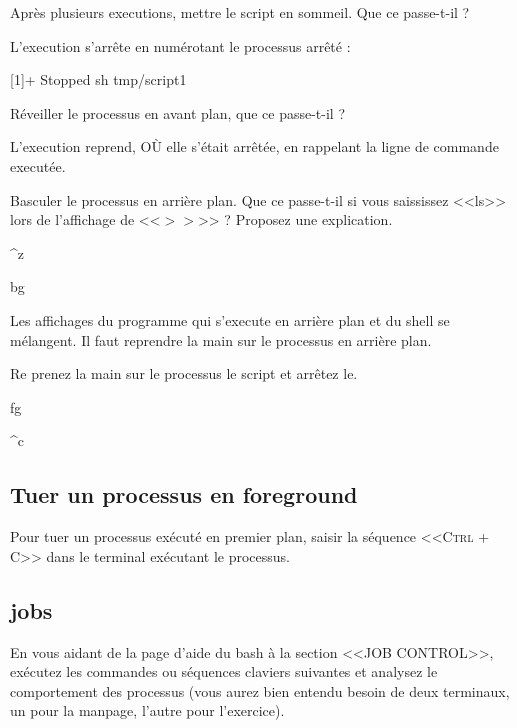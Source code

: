 \documentclass[11pt]{article}
\begin{document}
Après plusieurs executions, mettre le script en sommeil. Que ce passe-t-il ?

\begin{solution}
L'execution s'arrête en numérotant le processus arrêté :

[1]+  Stopped                 sh tmp/script1
\end{solution}

Réveiller le processus en avant plan, que ce passe-t-il ?

\begin{solution}
L'execution reprend, OÙ elle s'était arrêtée, en rappelant la ligne de commande executée.
\end{solution}

Basculer le processus en arrière plan. Que ce passe-t-il si vous saississez <<ls>> lors de l'affichage de <<$>> $>> ? Proposez une explication.

\begin{solution}

\^{}z

bg

Les affichages du programme qui s'execute en arrière plan et du shell se mélangent. Il faut reprendre la main sur le processus en arrière plan.

\end{solution}

Re prenez la main sur le processus le script et arrêtez le.

\begin{solution}

fg

\^{}c
\end{solution}

\subsection{Tuer un processus en foreground}

Pour tuer un processus exécuté en premier plan, saisir la séquence \textsc{<<Ctrl + C>>} dans le terminal exécutant le processus.

\subsection{jobs}

En vous aidant de la page d’aide du bash à la section <<JOB CONTROL>>, exécutez les commandes ou séquences claviers suivantes et analysez le comportement des processus (vous aurez bien
entendu besoin de deux terminaux, un pour la manpage, l’autre pour l’exercice).
\end{document}
